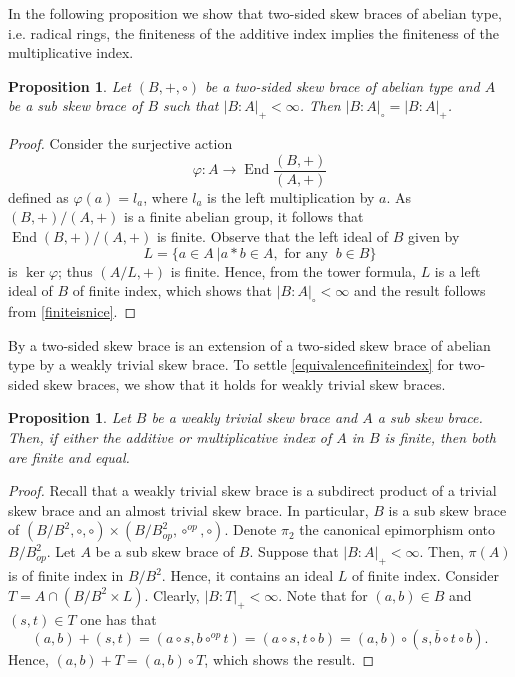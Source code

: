 \documentclass{amsart}
\newcommand{\End}{\operatorname{End}}
\newtheorem{pro}[thm]{Proposition}
\begin{document}
In the following proposition we show that two-sided skew braces of abelian type,
i.e. radical rings, the finiteness of the additive index implies the finiteness of the multiplicative index.

 \begin{pro}\label{atts}
    Let $(B,+,\circ)$ be a two-sided skew brace of abelian type and $A$ be a sub skew brace of $B$ such that $|B:A|_+<\infty$. Then $|B:A|_\circ=|B:A|_+$.
\end{pro}
\begin{proof}
    Consider the surjective action $$\varphi:A\to \End\frac{(B,+)}{(A,+)}$$ defined as $\varphi(a)=l_a$, where $l_a$ is the left multiplication by $a$. As $(B,+)/(A,+)$ is a finite abelian group, it follows that $\End(B,+)/(A,+)$ is finite. Observe that the left ideal of $B$ given by $$L=\{a\in A \ | a*b\in A, \text{ for any } \ b\in B\}$$ is $\ker \varphi$; thus $(A/L,+)$ is finite. Hence, from the tower formula, $L$ is a left ideal of $B$ of finite index, which shows that $|B:A|_\circ<\infty$ and the result follows from \cref{finiteisnice}.   
\end{proof}

By \cite{Trappeniers} a two-sided skew brace is an extension of a two-sided skew brace of abelian type
by a weakly trivial skew brace. To settle \cref{equivalencefiniteindex} for two-sided skew braces, we show that it holds for weakly trivial skew braces.

\begin{pro}\label{indexweaklytriv}
    Let $B$ be a weakly trivial skew brace and $A$ a sub skew brace. Then, if either the additive or multiplicative index of $A$ in $B$ is finite, then both are finite and equal.
\end{pro}
\begin{proof}
    Recall that a weakly trivial skew brace is a subdirect product of a trivial skew brace and an almost trivial skew brace. In particular, $B$ is a sub skew brace of $(B/B^2,\circ,\circ) \times (B/B^2_{op},\circ^{op},\circ)$. Denote $\pi_2$ the canonical epimorphism onto $B/B^2_{op}$. Let $A$ be a sub skew brace of $B$. Suppose that $|B:A|_+<\infty$. Then, $\pi(A)$ is of finite index in $B/B^2$. Hence, it contains an ideal $L$ of finite index. Consider $T=A \cap (B/B^2 \times L)$. Clearly, $|B:T|_+<\infty$. Note that for $(a,b) \in B$ and $(s,t)\in T$ one  has that $$ (a,b)+(s,t) = (a\circ s,b\circ^{op}t) = (a\circ s, t\circ b) = (a,b)\circ(s,\overline{b}\circ t \circ b). $$ Hence, $(a,b)+T=(a,b)\circ T$, which shows the result. 
\end{proof}
\end{document}
